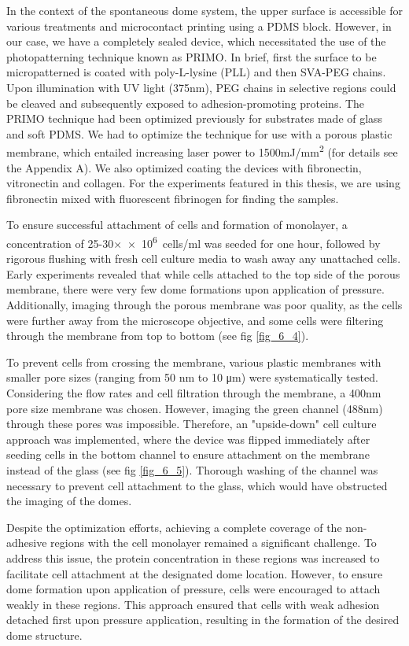 In the context of the spontaneous dome system, the upper surface is accessible for various treatments and microcontact printing using a PDMS block. However, in our case, we have a completely sealed device, which necessitated the use of the photopatterning technique known as PRIMO. In brief, first the surface to be micropatterned is coated with poly-L-lysine (PLL) and then SVA-PEG chains. Upon illumination with UV light (375\unit{\nm}), PEG chains in selective regions could be cleaved and subsequently exposed to adhesion-promoting proteins. The PRIMO technique had been optimized previously for substrates made of glass and soft PDMS. We had to optimize the technique for use with a porous plastic membrane, which entailed increasing laser power to 1500\unit{mJ/\mm^2} (for details see the Appendix A). We also optimized coating the devices with fibronectin, vitronectin and collagen. For the experiments featured in this thesis, we are using fibronectin mixed with fluorescent fibrinogen for finding the samples.

To ensure successful attachment of cells and formation of monolayer, a concentration of 25-30×\unit{\num{e6} cells/\ml} was seeded for one hour, followed by rigorous flushing with fresh cell culture media to wash away any unattached cells. Early experiments revealed that while cells attached to the top side of the porous membrane, there were very few dome formations upon application of pressure. Additionally, imaging through the porous membrane was poor quality, as the cells were further away from the microscope objective, and some cells were filtering through the membrane from top to bottom (see fig \ref{fig_6_4}).  

To prevent cells from crossing the membrane, various plastic membranes with smaller pore sizes (ranging from 50 \unit{\nm} to 10 \unit{\um}) were systematically tested. Considering the flow rates and cell filtration through the membrane, a 400\unit{\nm} pore size membrane was chosen. However, imaging the green channel (488\unit{\nm}) through these pores was impossible. Therefore, an "upside-down" cell culture approach was implemented, where the device was flipped immediately after seeding cells in the bottom channel to ensure attachment on the membrane instead of the glass (see fig \ref{fig_6_5}). Thorough washing of the channel was necessary to prevent cell attachment to the glass, which would have obstructed the imaging of the domes.

Despite the optimization efforts, achieving a complete coverage of the non-adhesive regions with the cell monolayer remained a significant challenge. To address this issue, the protein concentration in these regions was increased to facilitate cell attachment at the designated dome location. However, to ensure dome formation upon application of pressure, cells were encouraged to attach weakly in these regions. This approach ensured that cells with weak adhesion detached first upon pressure application, resulting in the formation of the desired dome structure.

